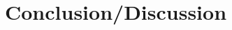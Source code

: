 \documentclass[prd,preprint]{revtex4}
\begin{document}
\section{Conclusion/Discussion}





\nocite{Littenberg2009}


\end{document}
